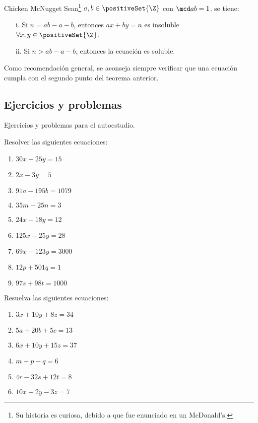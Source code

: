 \begin{theorem.box}{Chicken McNugget}{}
    Sean\footnote{Su historia es curiosa, debido a que fue enunciado en un McDonald's.} $a, b\in \positiveSet{\Z}$ con $\mcd a b = 1$, se tiene:
    \begin{enumerate}
        \item[i.] Si $n = ab - a - b$, entonces $ax + by = n$ es insoluble $\forall x, y \in \positiveSet{\Z}$.
        \item[ii.] Si $n > ab - a - b$, entonces la ecuación es soluble.
    \end{enumerate}
\end{theorem.box}
Como recomendación general, se aconseja siempre verificar que una ecuación cumpla con el segundo punto del teorema anterior.




\subsection{Ejercicios y problemas}

Ejercicios y problemas para el autoestudio.

\begin{exercise}
    Resolver las siguientes ecuaciones:
    \begin{multicols}{3}
        \begin{enumerate}
            \item $30x - 25y = 15$
            \item $2x - 3y = 5$
            \item $91a - 195b = 1079$
            \item $35m - 25n = 3$
            \item $24x + 18y = 12$
            \item $125x - 25y = 28$
            \item $69x + 123y = 3000$
            \item $12p + 501q=1$
            \item $97s + 98t=1000$
        \end{enumerate}
    \end{multicols}
\end{exercise}

\begin{exercise}
    Resuelva las siguientes ecuaciones:
    \begin{multicols}{3}
        \begin{enumerate}
            \item $3x+10y+8z=34$
            \item $5a+20b+5c=13$
            \item $6x+10y+15z=37$
            \item $m+p-q=6$
            \item $4r-32s+12t=8$
            \item $10x+2y-3z=7$
        \end{enumerate}
    \end{multicols}
\end{exercise}

